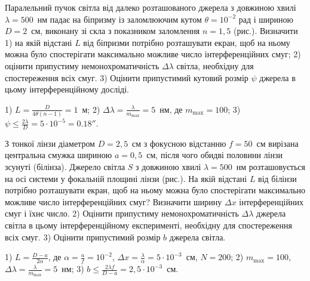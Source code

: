 \begin{problem}%
Паралельний пучок світла від далеко розташованого джерела з
довжиною хвилі $ \lambda = 500 $~нм падає на біпризму із заломлюючим кутом $ \theta
	= 10^{-2} $ рад і шириною $ D = 2 $~см, виконану зі скла з показником
заломлення $ n = 1,5 $ (рис.). Визначити 1) на якій відстані $ L $ від біпризми
потрібно розташувати екран, щоб на ньому можна було спостерігати
максимально можливе число інтерференційних смуг; 2) оцінити
припустиму немонохроматичність $ \Delta\lambda $ світла, необхідну для
спостереження всіх смуг. 3) Оцінити припустимий кутовий розмір $ \psi $
джерела в цьому інтерференційному досліді.

\begin{center}
	
\end{center}

\begin{solution}
	1) $L = \frac{D}{4\theta (n - 1)} = 1$~м; 2) $ \Delta\lambda = \frac{\lambda}{m_{\max}} = 5$~нм, де $m_{\max} = 100$; 3) $\psi \le \frac{2\lambda}{D} = 5\cdot10^{-5} = 0.18''$.
\end{solution}
\end{problem}



\begin{problem}%
З тонкої лінзи діаметром $ D = 2,5 $~см з фокусною відстанню $ f = 50 $~см
вирізана центральна смужка шириною $ a = 0,5 $~см, після чого обидві
половини лінзи зсунуті (білінза). Джерело світла $ S $ з довжиною хвилі $ \lambda =
	500 $~нм розташовується на осі системи у фокальній площині лінзи (рис.).
На якій відстані $ L $ від білінзи потрібно розташувати екран, щоб
на ньому можна було спостерігати максимально можливе число
інтерференційних смуг? Визначити ширину $ \Delta x $ інтерференційних смуг і
їхнє число. 2) Оцінити припустиму немонохроматичність $ \Delta\lambda $ джерела
світла в цьому інтерференційному експерименті, необхідну для
спостереження всіх смуг. 3) Оцінити припустимий розмір $ b $ джерела
світла.

\begin{center}
	
\end{center}

\begin{solution}
	1) $L = \frac{D - a}{2\alpha}$, де $\alpha = \frac{a}{f} = 10^{-2}$, $ \Delta x  = \frac{\lambda}{\alpha} = 5\cdot10^{-3}$~см, $N = 200$; 2) $m_{\max} = 100$,  $ \Delta\lambda = \frac{\lambda}{m_{\max}} = 5$~нм; 3) $b \le \frac{2\lambda f}{D - a} = 2,5\cdot10^{-3}$~см.
\end{solution}
\end{problem}



